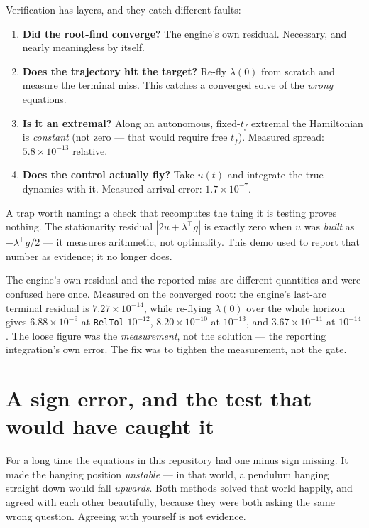 \documentclass[11pt]{article}
\newcommand{\tf}{t_f}
\begin{document}
\begin{intu}
Verification has layers, and they catch different faults:
\begin{enumerate}
\item \textbf{Did the root-find converge?} The engine's own residual. Necessary,
  and nearly meaningless by itself.
\item \textbf{Does the trajectory hit the target?} Re-fly $\lambda(0)$ from
  scratch and measure the terminal miss. This catches a converged solve of the
  \emph{wrong} equations.
\item \textbf{Is it an extremal?} Along an autonomous, fixed-$\tf$ extremal the
  Hamiltonian is \emph{constant} (not zero --- that would require free $\tf$).
  Measured spread: $5.8\times10^{-13}$ relative.
\item \textbf{Does the control actually fly?} Take $u(t)$ and integrate the true
  dynamics with it. Measured arrival error: $1.7\times10^{-7}$.
\end{enumerate}
A trap worth naming: a check that recomputes the thing it is testing proves
nothing. The stationarity residual $|2u+\lambda^\top g|$ is exactly zero when $u$
was \emph{built} as $-\lambda^\top g/2$ --- it measures arithmetic, not
optimality. This demo used to report that number as evidence; it no longer does.
\end{intu}

\begin{rig}
The engine's own residual and the reported miss are different quantities and
were confused here once. Measured on the converged root: the engine's last-arc
terminal residual is $7.27\times10^{-14}$, while re-flying $\lambda(0)$ over the
whole horizon gives $6.88\times10^{-9}$ at \texttt{RelTol} $10^{-12}$,
$8.20\times10^{-10}$ at $10^{-13}$, and $3.67\times10^{-11}$ at $10^{-14}$. The
loose figure was the \emph{measurement}, not the solution --- the reporting
integration's own error. The fix was to tighten the measurement, not the gate.
\end{rig}

\section{A sign error, and the test that would have caught it}\label{sec:signerror}

\begin{eli}
For a long time the equations in this repository had one minus sign missing. It
made the hanging position \emph{unstable} --- in that world, a pendulum hanging
straight down would fall \emph{upwards}. Both methods solved that world happily,
and agreed with each other beautifully, because they were both asking the same
wrong question. Agreeing with yourself is not evidence.
\end{eli}
\end{document}
